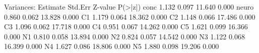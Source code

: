 \begin{Schunk}
\begin{Soutput}
Variances:
                   Estimate  Std.Err  Z-value  P(>|z|)
    conc              1.132    0.097   11.640    0.000
    neuro             0.860    0.062   13.828    0.000
    C1                1.179    0.064   18.362    0.000
    C2                1.148    0.066   17.486    0.000
    C3                1.096    0.062   17.718    0.000
    C4                0.951    0.067   14.262    0.000
    C5                1.621    0.099   16.366    0.000
    N1                0.810    0.058   13.894    0.000
    N2                0.824    0.057   14.542    0.000
    N3                1.122    0.068   16.399    0.000
    N4                1.627    0.086   18.806    0.000
    N5                1.880    0.098   19.206    0.000
\end{Soutput}
\end{Schunk}
